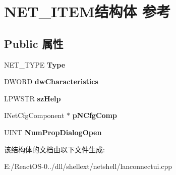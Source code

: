 \hypertarget{struct_n_e_t___i_t_e_m}{}\section{N\+E\+T\+\_\+\+I\+T\+E\+M结构体 参考}
\label{struct_n_e_t___i_t_e_m}
\subsection*{Public 属性}
\begin{DoxyCompactItemize}
\item 
\mbox{\label{struct_n_e_t___i_t_e_m_a1deaf8f45584e85a513b4ed841939c07}} 
N\+E\+T\+\_\+\+T\+Y\+PE {\bfseries Type}
\item 
\mbox{\label{struct_n_e_t___i_t_e_m_ab4d55ccecc7a3dce673ebe08d47993a9}} 
D\+W\+O\+RD {\bfseries dw\+Characteristics}
\item 
\mbox{\label{struct_n_e_t___i_t_e_m_a7f564f0107d9f9c8aacbf8af1db2b404}} 
L\+P\+W\+S\+TR {\bfseries sz\+Help}
\item 
\mbox{\label{struct_n_e_t___i_t_e_m_a0b58c6c0273e6c76483f8d4ffb874fc0}} 
I\+Net\+Cfg\+Component $\ast$ {\bfseries p\+N\+Cfg\+Comp}
\item 
\mbox{\label{struct_n_e_t___i_t_e_m_a7f16ebc8068ce406f12c7809ef182cea}} 
U\+I\+NT {\bfseries Num\+Prop\+Dialog\+Open}
\end{DoxyCompactItemize}


该结构体的文档由以下文件生成\+:\begin{DoxyCompactItemize}
\item 
E\+:/\+React\+O\+S-\/0../dll/shellext/netshell/lanconnectui.\+cpp\end{DoxyCompactItemize}
